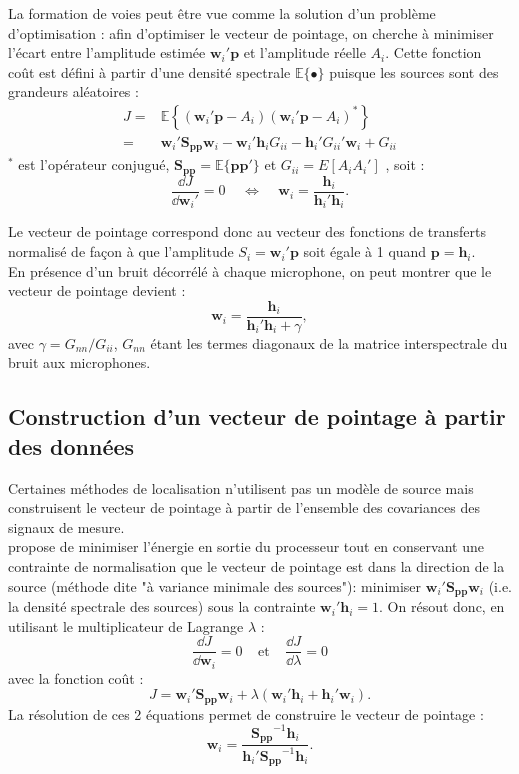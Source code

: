 La formation de voies peut être vue comme la solution d'un problème d'optimisation : afin d'optimiser le vecteur de pointage, on cherche à minimiser l'écart entre l'amplitude estimée $\bm{w}_i'\bm{p}$ et l'amplitude réelle $A_i$. Cette fonction coût est défini à partir d'une densité spectrale $\mathbb{E}\{\bullet\}$ puisque les sources sont des grandeurs aléatoires :
\begin{align}
	J=&\mathbb{E}\left\{ (\bm{w}_i'\bm{p}-A_i)(\bm{w}_i'\bm{p}-A_i)^* \right\}\\
	 =& \bm{w}_i'\bm{S_{pp}}\bm{w}_i-\bm{w}_i'\bm{h}_iG_{ii}-\bm{h}_i'G_{ii}'\bm{w}_i + G_{ii}
\end{align}
$^*$ est l'opérateur conjugué, $\bm{S_{pp}}=\mathbb{E}\{\bm{p}\bm{p}'\}$ et $G_{ii}=E[A_iA_i']$ , soit : 
\begin{equation}
	\frac{\dd J}{\dd \bm{w}_i'}=0 ~~~~~\Leftrightarrow ~~~~~ \bm{w}_i=\frac{\bm{h}_i}{\bm{h}_i'\bm{h}_i}.
\end{equation}

Le vecteur de pointage correspond donc au vecteur des fonctions de transferts normalisé de façon à que l'amplitude $S_i=\bm{w}_i'\bm{p}$ soit égale à 1 quand $\bm{p}=\bm{h}_i$.\\

En présence d'un bruit décorrélé à chaque microphone, on peut montrer que le vecteur de pointage devient : 
\begin{equation}
	\bm{w}_i=\frac{\bm{h}_i}{\bm{h}_i'\bm{h}_i+\gamma},
\end{equation}
avec $\gamma=G_{nn}/G_{ii}$, $G_{nn}$ étant les termes diagonaux de la matrice interspectrale du bruit aux microphones.




\subsection{Construction d'un vecteur de pointage à partir des données}
Certaines méthodes de localisation n'utilisent pas un modèle de source mais construisent le vecteur de pointage à partir de l'ensemble des covariances des signaux de mesure. \\
\cite{Capon1969} propose de minimiser l'énergie en sortie du processeur tout en conservant une contrainte de normalisation que le vecteur de pointage est dans la direction de la source (méthode dite "à variance minimale des sources"): minimiser $\bm{w}_i'\bm{S_{pp}}\bm{w}_i$ (i.e. la densité spectrale des sources) sous la contrainte $\bm{w}_i'\bm{h}_i=1$.
On résout donc, en utilisant le multiplicateur de Lagrange $\lambda$ : 
\begin{equation}
\frac{\dd J}{\dd\bm{w}_i}=0~~~~~\text{et}~~~~~\frac{\dd J}{\dd\lambda}=0
\end{equation}
avec la fonction coût : 
\begin{equation}
J=\bm{w}_i'\bm{S_{pp}}\bm{w}_i + \lambda(\bm{w}_i'\bm{h}_i+\bm{h}_i'\bm{w}_i).
\end{equation}
La résolution de ces 2 équations permet de construire le vecteur de pointage : 
\begin{equation}
	\bm{w}_i=\frac{\bm{S_{pp}}^{-1}\bm{h}_{i}}{\bm{h}_i'\bm{S_{pp}}^{-1}\bm{h}_{i}}.
\end{equation}

